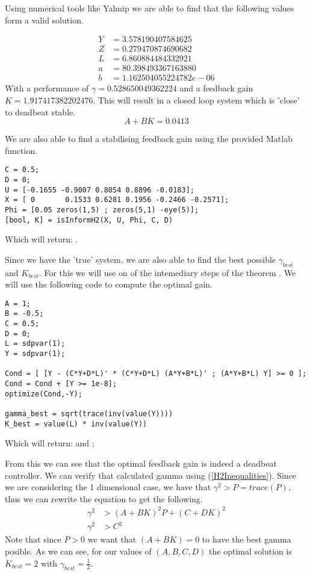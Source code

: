 Using numerical tools like Yalmip we are able to find that the following values form a valid solution.

\begin{align*}
	Y &= 3.578190407584625 \\
	Z &= 0.279470874690682 \\
	L &= 6.860884484332921 \\
	a &= 80.398493367163880 \\
	b &= 1.162504055224782e-06
\end{align*}
With a performance of $\gamma = 0.528650049362224$ and a feedback gain $K = 1.917417382202476$. This will result in a closed loop system which is 'close' to deadbeat stable.
\begin{equation*}
	A + BK = 0.0413
\end{equation*}

We are also able to find a stabilising feedback gain using the provided Matlab function.
\begin{lstlisting}
C = 0.5;
D = 0;
U = [-0.1655 -0.9007 0.8054 0.8896 -0.0183];
X = [ 0       0.1533 0.6281 0.1956 -0.2466 -0.2571];
Phi = [0.05 zeros(1,5) ; zeros(5,1) -eye(5)];
[bool, K] = isInformH2(X, U, Phi, C, D)
\end{lstlisting}
Which will return: \mon{[ 1, 1.917417382202475 ]}.

Since we have the 'true' system, we are also able to find the best possible $\gamma_{best}$ and $K_{best}$. For this we will use on of the intemediary steps of the theorem \cite[Equation 36]{waarde2020noisy}. We will use the following code to compute the optimal gain.
\begin{lstlisting}
A = 1;
B = -0.5;
C = 0.5;
D = 0;
L = sdpvar(1);
Y = sdpvar(1);

Cond = [ [Y - (C*Y+D*L)' * (C*Y+D*L) (A*Y+B*L)' ; (A*Y+B*L) Y] >= 0 ];
Cond = Cond + [Y >= 1e-8];
optimize(Cond,-Y);

gamma_best = sqrt(trace(inv(value(Y))))
K_best = value(L) * inv(value(Y))
\end{lstlisting}
Which will return:  and ;

From this we can see that the optimal feedback gain is indeed a deadbeat controller. We can verify that calculated gamma using (\ref{H2Inequalities}). Since we are considering the 1 dimensional case, we have that $\gamma^2 > P = trace(P)$, thus we can rewrite the equation to get the following. 
\begin{align*}
	\gamma^2 &> (A + BK)^2 P + (C+DK)^2 \\
	\gamma^2 &>  C^2
\end{align*}
Note that since $P>0$ we want that $(A+BK) = 0$ to have the best gamma posible. As we can see, for our values of $(A,B,C,D)$ the optimal solution is $K_{best} = 2$ with $\gamma_{best} = \frac{1}{2}$.